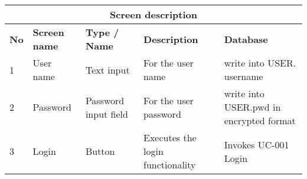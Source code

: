 \documentclass{article}
\begin{document}
\begin{table}[h]
\begin{tabularx}{\textwidth}{|l|X|X|X|X|}
\hline
 \multicolumn{5}{|c|}{\textbf{Screen description} } \\
\hline
\hline
\textbf{No} & \textbf{Screen name} & \textbf{Type / Name} & \textbf{Description} & \textbf{Database}  \\
\hline
1 & User name & Text input & For the user name  & write into USER. username  \\
\hline
2 & Password & Password input field & For the user password  & write into USER.pwd in encrypted format  \\
\hline
3 & Login & Button & Executes the login functionality  & Invokes UC-001 Login  \\
\hline

\end{tabularx}
\end{table}
\end{document}
